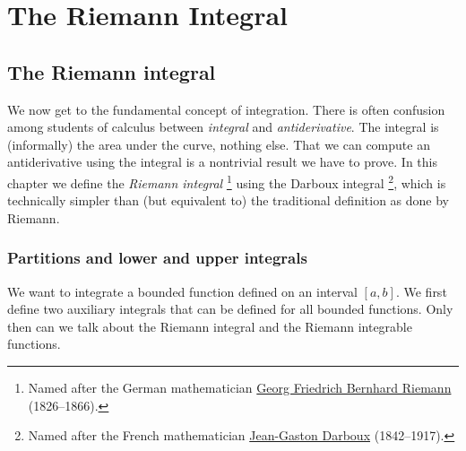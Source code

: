 \chapter{The Riemann Integral} \label{int:chapter}


\section{The Riemann integral}
\label{sec:rint}


We now get to the fundamental concept of integration.  There is
often confusion among students of
calculus between \emph{integral} and \emph{antiderivative}.
The integral is (informally) the area under the curve, nothing else.
That we can compute an antiderivative using the integral is a nontrivial
result we have to prove.  
In this chapter we define the \emph{Riemann integral}%
\footnote{Named after the German mathematician
\href{https://en.wikipedia.org/wiki/Riemann}{Georg Friedrich Bernhard Riemann}
(1826--1866).}
using the Darboux integral%
\footnote{Named after the French mathematician
\href{https://en.wikipedia.org/wiki/Darboux}{Jean-Gaston Darboux} (1842--1917).},
which is technically simpler than (but equivalent to) the traditional
definition as done by Riemann.

\subsection{Partitions and lower and upper integrals}

We want to integrate a bounded function defined on an interval $[a,b]$.
We first define two auxiliary integrals that can be defined for all
bounded functions.  Only then can we talk about the Riemann integral and
the Riemann integrable functions.

